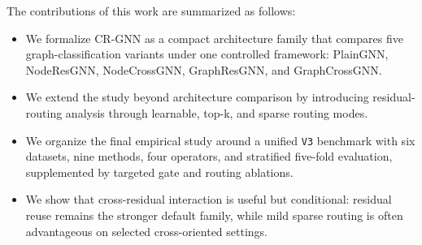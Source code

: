 The contributions of this work are summarized as follows:
\begin{itemize}
    \item We formalize CR-GNN as a compact architecture family that compares five graph-classification variants under one controlled framework: PlainGNN, NodeResGNN, NodeCrossGNN, GraphResGNN, and GraphCrossGNN.
    \item We extend the study beyond architecture comparison by introducing residual-routing analysis through learnable, top-k, and sparse routing modes.
    \item We organize the final empirical study around a unified \texttt{V3} benchmark with six datasets, nine methods, four operators, and stratified five-fold evaluation, supplemented by targeted gate and routing ablations.
    \item We show that cross-residual interaction is useful but conditional: residual reuse remains the stronger default family, while mild sparse routing is often advantageous on selected cross-oriented settings.
\end{itemize}
